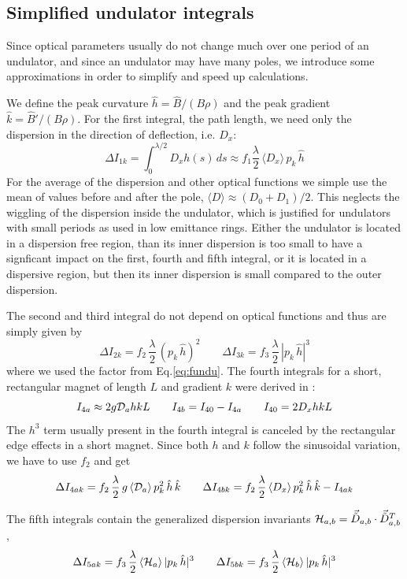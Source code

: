 \documentclass[12pt]{article}
\newcommand\beq{\begin{equation}}
\newcommand\eeq{\end{equation}}
\newcommand{\tilvec}[1]{\vec{\tilde{#1}}}
\begin{document}
\subsection{\label{ssecurad}Simplified undulator integrals}
Since optical parameters usually do not change much over one period of an undulator, and since an undulator may have many poles, we introduce some approximations in order to simplify and speed up calculations.

We define the peak curvature $\hat{h}= \hat{B}/(B\rho)$ and the peak gradient $\hat k = \hat{B}'/(B\rho)$.
For the first integral, the path length, we need only the dispersion in the direction of deflection, i.e. $D_x$:
\beq
\Delta I_{1k} = \int_0^{\lambda/2} D_x h(s)\,ds \approx f_1 \frac{\lambda}{2}\,\langle D_x \rangle \,p_k\,\hat{h}
\eeq
For the average of the dispersion and other optical functions we simple use the mean of values before and after the pole, $\langle D \rangle \approx (D_0+D_1)/2$. This neglects the wiggling of the dispersion inside the undulator, which is justified for undulators with small periods as used in low emittance rings. Either the undulator is located in a dispersion free region, than its inner dispersion is too small to have a signficant impact on the first, fourth and fifth integral, or it is located in a dispersive region, but then its inner dispersion is small compared to the outer dispersion.

The second and third integral do not depend on optical functions and thus are simply given by
\beq
\Delta I_{2k} = f_2\, \frac{\lambda}{2}\, (p_k\,\hat{h})^2 \qquad   \Delta I_{3k} = f_3\, \frac{\lambda}{2}\, |p_k\,\hat{h}|^3
\eeq
where we used the factor from Eq.\ref{eq:fundu}.
The fourth integrals for a short, rectangular magnet of length $L$ and gradient $k$ were derived in \cite{VZAS}:
\beq
I_{4a}  \approx  2 g {\cal D}_a  h k L\qquad I_{4b} = I_{40}-I_{4a}\qquad I_{40} = 2 D_x h k L
\eeq
The $h^3$ term usually present in the fourth integral is canceled by the rectangular edge effects in a short magnet.
Since both $h$ and $k$ follow the sinusoidal variation, we have to use $f_2$ and get
\beq
\Delta I_{4ak} = f_2\, \frac{\lambda}{2}\, g\, \langle {\cal D}_a \rangle\, p_k^2\,\hat{h}\,\hat{k}\qquad
\Delta I_{4bk} = f_2\, \frac{\lambda}{2}\, \langle {D_x} \rangle\, p_k^2\,\hat{h}\,\hat{k} - I_{4ak}
\eeq

The fifth integrals contain the generalized dispersion invariants
${\cal H}_{a,b} = \tilvec{D}_{a,b}\cdot \tilvec{D}_{a,b}^T$,
\beq
\Delta I_{5ak} = f_3\, \frac{\lambda}{2}\,\langle {\cal H}_a \rangle\, |p_k\,\hat{h}|^3\qquad
\Delta I_{5bk} = f_3\, \frac{\lambda}{2}\,\langle {\cal H}_b \rangle\, |p_k\,\hat{h}|^3
\eeq
\end{document}
